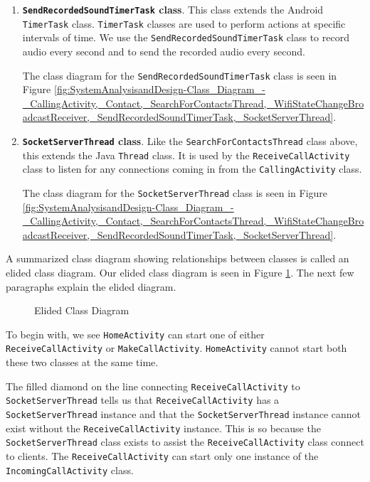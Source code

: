 \documentclass[12pt,svgnames,smaller]{article} %
\begin{document}
\begin{enumerate}
		\item \textbf{\texttt{SendRecordedSoundTimerTask} class}. This class extends the Android \texttt{TimerTask} class. \texttt{TimerTask} classes are used to perform actions at specific intervals of time. We use the \texttt{SendRecordedSoundTimerTask} class to record audio every second and to send the recorded audio every second.

		The class diagram for the \texttt{SendRecordedSoundTimerTask} class is seen in Figure \ref{fig:SystemAnalysisandDesign-Class_Diagram_-_CallingActivity,_Contact,_SearchForContactsThread,_WifiStateChangeBroadcastReceiver,_SendRecordedSoundTimerTask,_SocketServerThread}.
		
		\item \textbf{\texttt{SocketServerThread} class}. Like the \texttt{SearchForContactsThread} class above, this extends the Java \texttt{Thread} class. It is used by the \texttt{ReceiveCallActivity} class to listen for any connections coming in from the \texttt{CallingActivity} class. 
		
		The class diagram for the \texttt{SocketServerThread} class is seen in Figure \ref{fig:SystemAnalysisandDesign-Class_Diagram_-_CallingActivity,_Contact,_SearchForContactsThread,_WifiStateChangeBroadcastReceiver,_SendRecordedSoundTimerTask,_SocketServerThread}.
		
	\end{enumerate}
	
	A summarized class diagram showing relationships between classes is called an elided class diagram. Our elided class diagram is seen in Figure \ref{fig:SystemAnalysisandDesign-Class_Diagram_-_Elided}. The next few paragraphs explain the elided diagram.
	
		\begin{figure}
			\centering
			\caption{Elided Class Diagram}%
			\label{fig:SystemAnalysisandDesign-Class_Diagram_-_Elided}
		\end{figure}
	
	To begin with, we see \texttt{HomeActivity} can start one of either \texttt{ReceiveCallActivity} or \texttt{MakeCallActivity}. \texttt{HomeActivity} cannot start both these two classes at the same time.
	
	The filled diamond on the line connecting \texttt{ReceiveCallActivity} to \texttt{SocketServerThread} tells us that \texttt{ReceiveCallActivity} has a \texttt{SocketServerThread} instance and that the \texttt{SocketServerThread} instance cannot exist without the \texttt{ReceiveCallActivity} instance. This is so because the \texttt{SocketServerThread} class exists to assist the \texttt{ReceiveCallActivity} class connect to clients. The \texttt{ReceiveCallActivity} can start only one instance of the \texttt{IncomingCallActivity} class.
	
\end{document}
